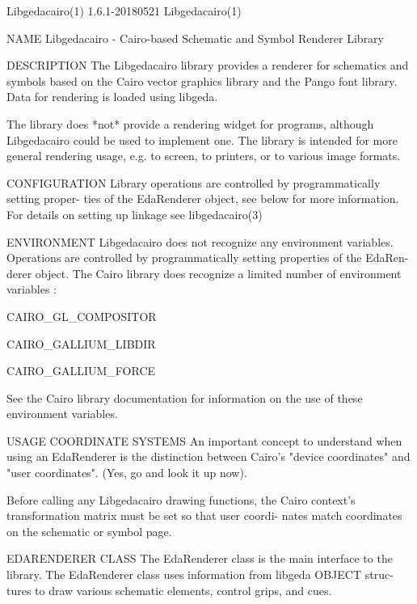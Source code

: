 Libgedacairo(1)                 1.6.1-20180521                 Libgedacairo(1)



NAME
       Libgedacairo - Cairo-based Schematic and Symbol Renderer Library

DESCRIPTION
       The Libgedacairo library provides a renderer for schematics and symbols
       based on the Cairo vector graphics library and the Pango font  library.
       Data for rendering is loaded using libgeda.

       The  library  does  *not*  provide  a  rendering  widget  for programs,
       although Libgedacairo could be used to implement one.  The  library  is
       intended for more general rendering usage, e.g. to screen, to printers,
       or to various image formats.

CONFIGURATION
       Library operations are controlled by programmatically  setting  proper-
       ties  of  the  EdaRenderer  object, see below for more information. For
       details on setting up linkage see libgedacairo(3)

ENVIRONMENT
       Libgedacairo does not recognize any environment  variables.  Operations
       are  controlled  by  programmatically setting properties of the EdaRen-
       derer object. The Cairo library does  recognize  a  limited  number  of
       environment variables :

          CAIRO_GL_COMPOSITOR

          CAIRO_GALLIUM_LIBDIR

          CAIRO_GALLIUM_FORCE

       See the Cairo library documentation for information on the use of these
       environment variables.

USAGE
          COORDINATE SYSTEMS
              An important concept to understand when using an EdaRenderer  is
              the  distinction  between Cairo's "device coordinates" and "user
              coordinates". (Yes, go and look it up now).

              Before calling any Libgedacairo  drawing  functions,  the  Cairo
              context's transformation matrix must be set so that user coordi-
              nates match coordinates on the schematic or symbol page.

          EDARENDERER CLASS
              The EdaRenderer class is the main interface to the library.  The
              EdaRenderer  class  uses  information from libgeda OBJECT struc-
              tures to draw various schematic  elements,  control  grips,  and
              cues.

